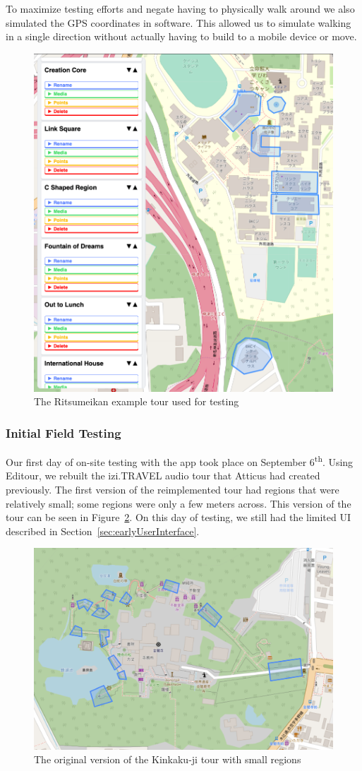 \documentclass[a4paper, 10pt, american, titlepage]{article}
\begin{document}
To maximize testing efforts and negate having to physically walk around we also
simulated the GPS coordinates in software. This allowed us to simulate walking
in a single direction without actually having to build to a mobile device or
move.

\begin{figure}[h]
	\centering
	\includegraphics[width=.5\textwidth]{ritsu-tour.png}
	\caption{The Ritsumeikan example tour used for testing}
	\label{fig:ritsuTour}
\end{figure}

\subsubsection{Initial Field Testing}
\label{sec:initialFieldTesting}

Our first day of on-site testing with the app took place on September
6\textsuperscript{th}. Using Editour, we rebuilt the izi.TRAVEL audio tour that
Atticus had created previously. The first version of the reimplemented tour had
regions that were relatively small; some regions were only a few meters across.
This version of the tour can be seen in Figure~\ref{fig:kinkakujiTour}. On this
day of testing, we still had the limited UI described in
Section~\ref{sec:earlyUserInterface}.

\begin{figure}[h]
	\centering
	\includegraphics[width=\textwidth]{kinkakuji-tour.png}
	\caption[The original version of the Kinkaku-ji tour]{The original version
		of the Kinkaku-ji tour with small regions}
	\label{fig:kinkakujiTour}
\end{figure}
\end{document}
